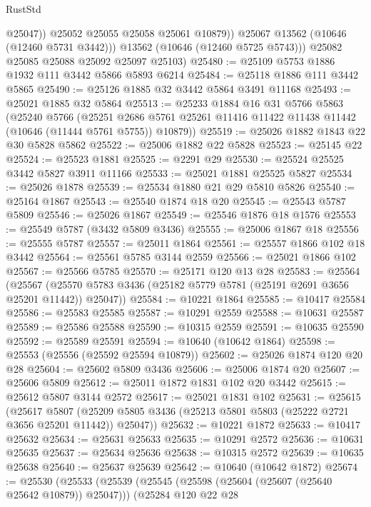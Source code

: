 \begin{lexlean}{RustStd}
\begin{coremodule}
                  @25047))
              @25052
              @25055
              @25058
              @25061
              @10879))
          @25067
          @13562
          (@10646 (@12460 @5731 @3442)))
        @13562
        (@10646 (@12460 @5725 @5743)))
      @25082
      @25085
      @25088
      @25092
      @25097
      @25103)
@25480 := @25109 @5753 @1886 @1932 @111 @3442 @5866 @5893 @6214
@25484 := @25118 @1886 @111 @3442 @5865
@25490 := @25126 @1885 @32 @3442 @5864 @3491 @11168
@25493 := @25021 @1885 @32 @5864
@25513 := @25233
    @1884
    @16
    @31
    @5766
    @5863
    (@25240
      @5766
      (@25251 @2686 @5761 @25261 @11416 @11422 @11438 @11442 (@10646 (@11444 @5761 @5755)) @10879))
@25519 := @25026 @1882 @1843 @22 @30 @5828 @5862
@25522 := @25006 @1882 @22 @5828
@25523 := @25145 @22
@25524 := @25523 @1881
@25525 := @2291 @29
@25530 := @25524 @25525 @3442 @5827 @3911 @11166
@25533 := @25021 @1881 @25525 @5827
@25534 := @25026 @1878
@25539 := @25534 @1880 @21 @29 @5810 @5826
@25540 := @25164 @1867
@25543 := @25540 @1874 @18 @20
@25545 := @25543 @5787 @5809
@25546 := @25026 @1867
@25549 := @25546 @1876 @18 @1576
@25553 := @25549 @5787 (@3432 @5809 @3436)
@25555 := @25006 @1867 @18
@25556 := @25555 @5787
@25557 := @25011 @1864
@25561 := @25557 @1866 @102 @18 @3442
@25564 := @25561 @5785 @3144 @2559
@25566 := @25021 @1866 @102
@25567 := @25566 @5785
@25570 := @25171 @120 @13 @28
@25583 := @25564
    (@25567 (@25570 @5783 @3436 (@25182 @5779 @5781 (@25191 @2691 @3656 @25201 @11442)) @25047))
@25584 := @10221 @1864
@25585 := @10417 @25584
@25586 := @25583 @25585
@25587 := @10291 @2559
@25588 := @10631 @25587
@25589 := @25586 @25588
@25590 := @10315 @2559
@25591 := @10635 @25590
@25592 := @25589 @25591
@25594 := @10640 (@10642 @1864)
@25598 := @25553 (@25556 (@25592 @25594 @10879))
@25602 := @25026 @1874 @120 @20 @28
@25604 := @25602 @5809 @3436
@25606 := @25006 @1874 @20
@25607 := @25606 @5809
@25612 := @25011 @1872 @1831 @102 @20 @3442
@25615 := @25612 @5807 @3144 @2572
@25617 := @25021 @1831 @102
@25631 := @25615
    (@25617
      @5807
      (@25209 @5805 @3436 (@25213 @5801 @5803 (@25222 @2721 @3656 @25201 @11442)) @25047))
@25632 := @10221 @1872
@25633 := @10417 @25632
@25634 := @25631 @25633
@25635 := @10291 @2572
@25636 := @10631 @25635
@25637 := @25634 @25636
@25638 := @10315 @2572
@25639 := @10635 @25638
@25640 := @25637 @25639
@25642 := @10640 (@10642 @1872)
@25674 := @25530
    (@25533
      (@25539
        (@25545 (@25598 (@25604 (@25607 (@25640 @25642 @10879)) @25047)))
        (@25284
          @120
          @22
          @28

\end{coremodule}
\end{lexlean}
